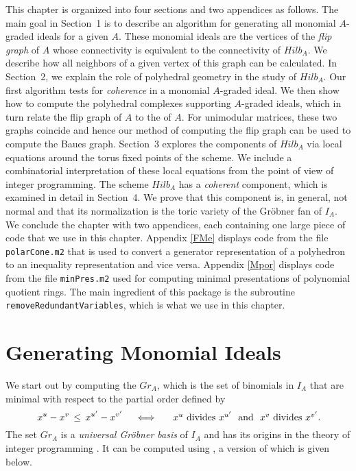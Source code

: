This chapter is organized into four sections and two appendices as
follows. The main goal in Section~1 is to describe an algorithm for
generating all monomial $A$-graded ideals for a given $A$. These
monomial ideals are the vertices of the {\em flip graph} of $A$ whose
connectivity is equivalent to the connectivity of $Hilb_A$. We
describe how all neighbors of a given vertex of this graph can be
calculated. In Section~2, we explain the role of polyhedral geometry
in the study of $Hilb_A$. Our first algorithm tests for {\em
coherence} in a monomial $A$-graded ideal. We then show how to compute
the polyhedral complexes supporting $A$-graded ideals, which in turn
relate the flip graph of $A$ to the {\em {}} of $A$.  For
unimodular matrices, these two graphs coincide and hence our method of
computing the flip graph can be used to compute the Baues
graph. Section~3 explores the components of $Hilb_A$ via local
equations around the torus fixed points of the scheme. We include a
combinatorial interpretation of these local equations from the point
of view of integer programming.  The scheme $Hilb_A$ has a {\em
coherent} component, which is examined in detail in Section~4. We prove
that this component is, in general, not normal and that its
normalization is the toric variety of the Gr\"obner fan of $I_A$. We
conclude the chapter with two appendices, each containing one large
piece of \Mtwo code that we use in this chapter. Appendix \ref{FMe} displays
code from the \Mtwo file {\tt polarCone.m2} that is used to convert a generator
representation of a polyhedron to an inequality representation and
vice versa. Appendix \ref{Mpor} displays code from the file {\tt minPres.m2} used for computing minimal
presentations of polynomial quotient rings. The main ingredient of
this package is the subroutine {\tt removeRedundantVariables}, which is
what we use in this chapter.

\section{Generating Monomial Ideals}
We start out by computing the {\it {}} $Gr_A$, which is the
set of binomials in $I_A$ that are minimal with respect to the
partial order defined by $$\, x^u - x^v \,\leq\, x^{u'} - x^{v'} \quad \iff
\quad \hbox{ $x^u$ divides $x^{u'}$ \ and \ $x^v$ divides $x^{v'}$.}
$$ The set $Gr_A$ is a {\em universal Gr\"obner basis} of $I_A$ and
has its origins in the theory of integer programming \cite{HS:Gra}. It
can be computed using \cite[Algorithm 7.2]{HS:St2}, a \Mtwo version of
which is given below.

